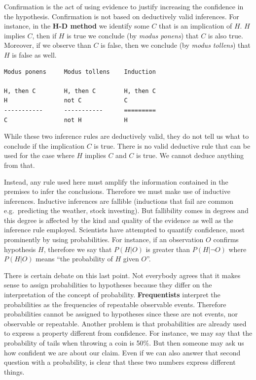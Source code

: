 \documentclass[
]{book}
\begin{document}
Confirmation is the act of using evidence to justify increasing the confidence in the hypothesis.
Confirmation is not based on deductively valid inferences. For instance, in the \textbf{H-D method} we identify some \(C\) that is an implication of \(H\). \(H\) implies \(C\), then if \(H\) is true we conclude (by \emph{modus ponens}) that \(C\) is also true. Moreover, if we observe than \(C\) is false, then we conclude (by \emph{modus tollens}) that \(H\) is false as well.

\begin{verbatim}
Modus ponens     Modus tollens    Induction

H, then C        H, then C        H, then C
H                not C            C
-----------      -----------      =========
C                not H            H 
\end{verbatim}

While these two inference rules are deductively valid, they do not tell us what to conclude if the implication \(C\) is true. There is no valid deductive rule that can be used for the case where \(H\) implies \(C\) and \(C\) is true. We cannot deduce anything from that.

Instead, any rule used here must amplify the information contained in the premises to infer the conclusions. Therefore we must make use of inductive inferences. Inductive inferences are fallible (inductions that fail are common e.g.~predicting the weather, stock investing). But fallibility comes in degrees and this degree is affected by the kind and quality of the evidence as well as the inference rule employed. Scientists have attempted to quantify confidence, most prominently by using probabilities. For instance, if an observation \(O\) confirms hypothesis \(H\), therefore we say that \(P(H|O)\) is greater than \(P(H|\lnot O)\) where \(P(H|O)\) means ``the probability of \(H\) given \(O\)''.

There is certain debate on this last point. Not everybody agrees that it makes sense to assign probabilities to hypotheses because they differ on the interpretation of the concept of probability. \textbf{Frequentists} interpret the probabilities as the frequencies of repeatable observable events. Therefore probabilities cannot be assigned to hypotheses since these are not events, nor observable or repeatable. Another problem is that probabilities are already used to express a property different from confidence. For instance, we may say that the probability of tails when throwing a coin is 50\%. But then someone may ask us how confident we are about our claim. Even if we can also answer that second question with a probability, is clear that these two numbers express different things.
\end{document}
